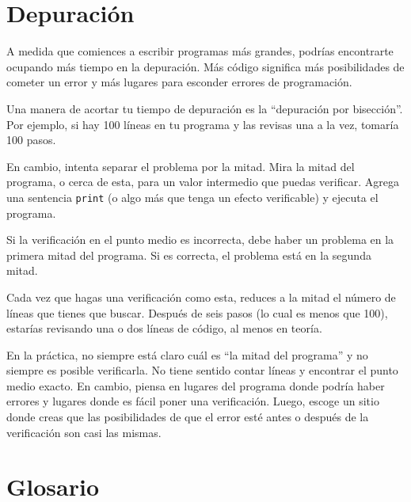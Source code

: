 \documentclass[10pt]{book}
\begin{document}
\section{Depuración}
\label{bisectbug}

A medida que comiences a escribir programas más grandes, podrías encontrarte
ocupando más tiempo en la depuración.  Más código significa más posibilidades de
cometer un error y más lugares para esconder errores de programación.

Una manera de acortar tu tiempo de depuración es la ``depuración por bisección''.
Por ejemplo, si hay 100 líneas en tu programa y las
revisas una a la vez, tomaría 100 pasos.

En cambio, intenta separar el problema por la mitad.  Mira la mitad
del programa, o cerca de esta, para un valor intermedio que
puedas verificar.  Agrega una sentencia {\tt print} (o algo más
que tenga un efecto verificable) y ejecuta el programa.

Si la verificación en el punto medio es incorrecta, debe haber un problema en la
primera mitad del programa.  Si es correcta, el problema está
en la segunda mitad.

Cada vez que hagas una verificación como esta, reduces a la mitad el número
de líneas que tienes que buscar.  Después de seis pasos (lo cual es menos que 100),
estarías revisando una o dos líneas de código, al menos en teoría.

En la práctica, no siempre está claro cuál es
``la mitad del programa'' y no siempre es posible
verificarla.  No tiene sentido contar líneas y encontrar el
punto medio exacto.  En cambio, piensa en lugares
del programa donde podría haber errores y lugares donde es
fácil poner una verificación.  Luego, escoge un sitio donde
creas que las posibilidades de que el error esté antes o después
de la verificación son casi las mismas.




\section{Glosario}
\end{document}
